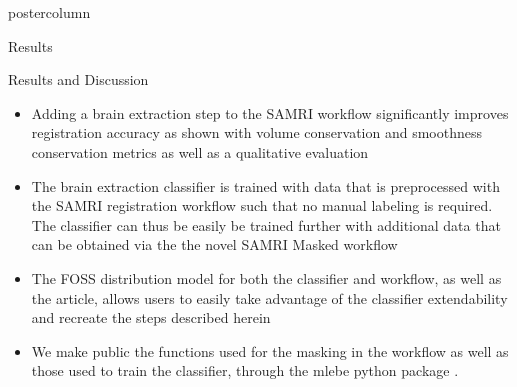 \begin{frame}
\begin{columns}
\begin{column}{.59\textwidth}
\begin{beamercolorbox}[center]{postercolumn}
\begin{minipage}{.98\textwidth}
{\begin{myblock}{Results}
                            \end{myblock}

                            \begin{myblock}{Results and Discussion}
                                \begin{itemize}
                                    \item Adding a brain extraction step to the SAMRI workflow significantly improves registration accuracy as shown with volume conservation and smoothness conservation metrics as well as a qualitative evaluation
                                    \item The brain extraction classifier is trained with data that is preprocessed with the SAMRI registration workflow such that no manual labeling is required.
                                    The classifier can thus be easily be trained further with additional data that can be obtained via the the novel SAMRI Masked workflow
                                    \item The FOSS distribution model for both the classifier and workflow, as well as the article, allows users to easily take advantage of the classifier extendability and recreate the steps described herein
                                    \item We make public the functions used for the masking in the workflow as well as those used to train the classifier, through the \textcolor{mg}{mlebe} python package \cite{mlebe}.


\end{itemize}
\end{myblock}}
\end{minipage}
\end{beamercolorbox}
\end{column}
\end{columns}
\end{frame}
